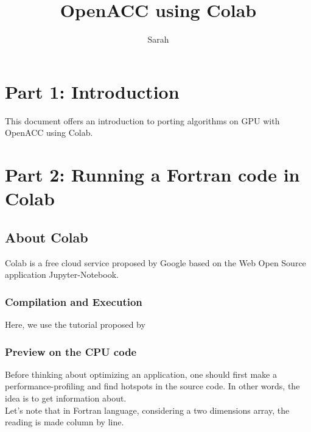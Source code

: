 \documentclass[10pt,a4paper]{article}
\author{Sarah}
\title{OpenACC using Colab}
\begin{document}
\maketitle{}
\newpage

\section{Part 1: Introduction}
This document offers an introduction to porting algorithms on GPU with OpenACC using Colab.\\

\section{Part 2: Running a Fortran code in Colab}
\subsection{About Colab}
Colab is a free cloud service proposed by Google based on the Web Open Source application Jupyter-Notebook.


\subsubsection{Compilation and Execution}
Here, we use the tutorial proposed by \href{https://colab.research.google.com/github/ENCCS/OpenACC-CUDA-beginners/blob/colab_gcc/examples/openACC_CUDA_colab.ipynb#scrollTo=6WS9YBwSAsnf}{}

\subsubsection{Preview on the CPU code}
Before thinking about optimizing an application, one should first make a performance-profiling and find hotspots in the source code. In other words, the idea is to get information about.\\
Let's note that in Fortran language, considering a two dimensions array, the reading is made column by line. 
\end{document}
